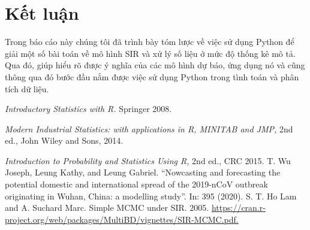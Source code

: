 \documentclass[a4paper]{article}
\begin{document}
\section{Kết luận}
Trong báo cáo này chúng tôi đã trình bày tóm lược về việc sử dụng Python để giải một số bài toán về mô hình SIR và xử lý số liệu ở mức độ thống kê mô tả. Qua đó, giúp hiểu rõ được ý nghĩa của các mô hình dự báo, ứng dụng nó và cũng thông qua đó bước đầu nắm được việc sử dụng Python trong tình toán và phân tích dữ liệu.
\newpage
{}
\begin{thebibliography}{99999}
 {\em Introductory Statistics with R.}  Springer 2008.

{\em Modern Industrial Statistics: with applications in R, MINITAB and JMP,} 2nd ed.,  John Wiley and Sons, 2014.

{\em Introduction to Probability and Statistics Using R,} 2nd ed., CRC 2015.
 T. Wu Joseph, Leung Kathy, and Leung Gabriel. “Nowcasting and forecasting the
potential domestic and international spread of the 2019-nCoV outbreak originating
in Wuhan, China: a modelling study”. In: 395 (2020).
 S. T. Ho Lam and A. Suchard Marc. Simple MCMC under SIR. 2005. \url{https://cran.r-project.org/web/packages/MultiBD/vignettes/SIR-MCMC.pdf.}
\end{thebibliography}
\end{document}
